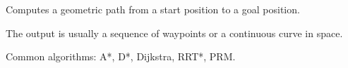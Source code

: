 \documentclass[a4paper]{article}
\title{}
\date{}
\begin{document}
    \maketitle
    Computes a geometric path from a start position to a goal position.
    
    The output is usually a sequence of waypoints or a continuous curve in space.
    
    Common algorithms: A*, D*, Dijkstra, RRT*, PRM.
\end{document}
